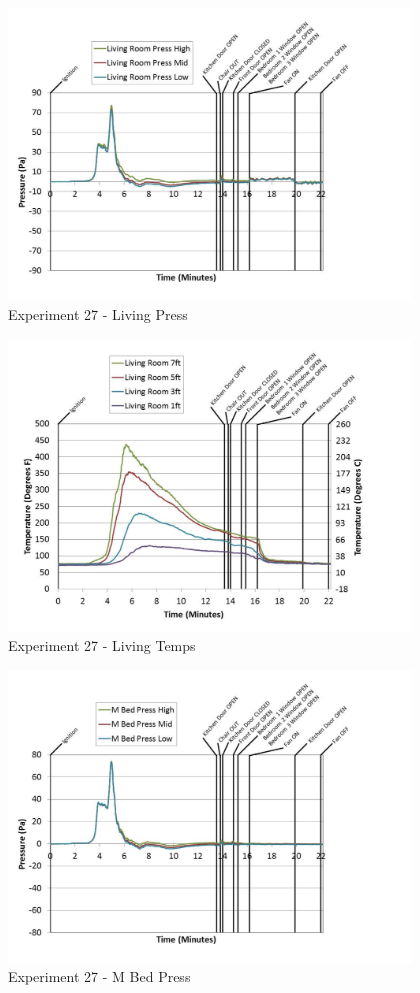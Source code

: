 \documentclass{article}
\begin{document}
\begin{appendices}
	\clearpage

	\begin{figure}[h!]
		\centering
		\includegraphics[height=3.05in]{0_Images/Results_Charts/Exp_27_Charts/LivingPress.pdf}
		\caption{Experiment 27 - Living Press}
	\end{figure}
 

	\begin{figure}[h!]
		\centering
		\includegraphics[height=3.05in]{0_Images/Results_Charts/Exp_27_Charts/LivingTemps.pdf}
		\caption{Experiment 27 - Living Temps}
	\end{figure}
 
	\clearpage

	\begin{figure}[h!]
		\centering
		\includegraphics[height=3.05in]{0_Images/Results_Charts/Exp_27_Charts/MBedPress.pdf}
		\caption{Experiment 27 - M Bed Press}
	\end{figure}
 


\end{appendices}
\end{document}
